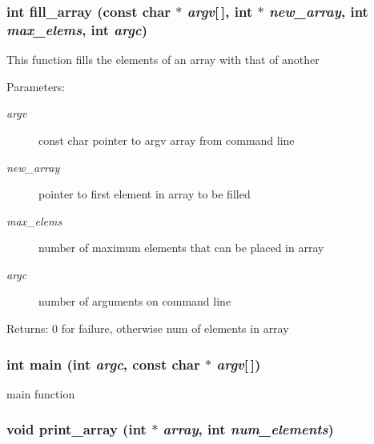 \subsubsection{\setlength{\rightskip}{0pt plus 5cm}int fill\_\-array (const char $\ast$ {\em argv}[$\,$], int $\ast$ {\em new\_\-array}, int {\em max\_\-elems}, int {\em argc})}\label{assig3_8c_7efe7f2b902b9a5c80f320b570621e5a}


This function fills the elements of an array with that of another \begin{Desc}
\item[Parameters:]
\begin{description}
\item[{\em argv}]const char pointer to argv array from command line \item[{\em new\_\-array}]pointer to first element in array to be filled \item[{\em max\_\-elems}]number of maximum elements that can be placed in array \item[{\em argc}]number of arguments on command line \end{description}
\end{Desc}
\begin{Desc}
\item[Returns:]0 for failure, otherwise num of elements in array \end{Desc}
\subsubsection{\setlength{\rightskip}{0pt plus 5cm}int main (int {\em argc}, const char $\ast$ {\em argv}[$\,$])}\label{assig3_8c_c0f2228420376f4db7e1274f2b41667c}


main function 

\subsubsection{\setlength{\rightskip}{0pt plus 5cm}void print\_\-array (int $\ast$ {\em array}, int {\em num\_\-elements})}\label{assig3_8c_8d05914dfc431857377538709fc5d8a2}


